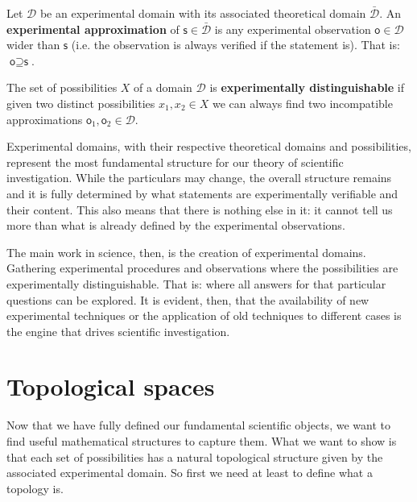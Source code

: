 \documentclass[11pt,letterpaper,fleqn]{memoir} %
\begin{document}
\begin{mathSection}
\begin{defn}
	Let $\mathcal{D}$ be an experimental domain with its associated theoretical domain $\bar{\mathcal{D}}$. An \textbf{experimental approximation} of $\textsf{s} \in \bar{\mathcal{D}}$ is any experimental observation $\textsf{o} \in \mathcal{D}$ wider than $\textsf{s}$ (i.e. the observation is always verified if the statement is). That is: $\textsf{o} \supseteq \textsf{s}$.
\end{defn}

\begin{defn}
	The set of possibilities $X$ of a domain $\mathcal{D}$ is \textbf{experimentally distinguishable} if given two distinct possibilities $x_1, x_2 \in X$ we can always find two incompatible approximations $\textsf{o}_1, \textsf{o}_2 \in \mathcal{D}$.
\end{defn}
\end{mathSection}

Experimental domains, with their respective theoretical domains and possibilities, represent the most fundamental structure for our theory of scientific investigation. While the particulars may change, the overall structure remains and it is fully determined by what statements are experimentally verifiable and their content. This also means that there is nothing else in it: it cannot tell us more than what is already defined by the experimental observations.

The main work in science, then, is the creation of experimental domains. Gathering experimental procedures and observations where the possibilities are experimentally distinguishable. That is: where all answers for that particular questions can be explored. It is evident, then, that the availability of new experimental techniques or the application of old techniques to different cases is the engine that drives scientific investigation.

\section{Topological spaces}

Now that we have fully defined our fundamental scientific objects, we want to find useful mathematical structures to capture them. What we want to show is that each set of possibilities has a natural topological structure given by the associated experimental domain. So first we need at least to define what a topology is.
\end{document}
